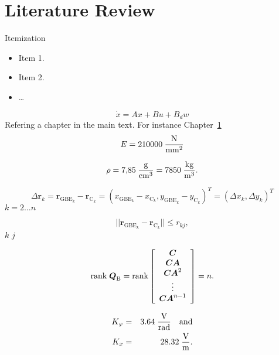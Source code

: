 \section{Literature Review}
\label{sec:review}
%
Itemization
\begin{itemize}
\item Item 1.
\item Item 2.
\item \ldots

\end{itemize}

\begin{equation}
\dot{x}=Ax+Bu+B_dw
\end{equation}
%
 Refering a chapter in the main text. For instance Chapter~\ref{sec:review} 
%
\begin{eqnarray} \nonumber
E = 210000\hspace{0.25em}{\mathrm{\frac{N}{mm^2}}}
\end{eqnarray}
%

%
\begin{eqnarray}\nonumber
\rho = 7{,}85\hspace{0.25em}{\mathrm{\frac{g}{cm^3}}}=
7850\hspace{0.25em}{\mathrm{\frac{kg}{m^3}}}.
\end{eqnarray}
%

\begin{equation}
  \Delta \boldsymbol{r}_k= \boldsymbol{r}_{\mathrm{GBE}_k} -
  \boldsymbol{r}_{\mathrm{C}_k} = (x_{\mathrm{GBE}_k} - x_{\mathrm{C}_k},
  y_{\mathrm{GBE}_k} - y_{\mathrm{C}_k})^T = (\Delta x_k,\Delta
  y_k)^T
\end{equation}
%
 $k=2 \dots n$

%
\begin{equation}
  || \boldsymbol{r}_{\mathrm{GBE}_k} -
  \boldsymbol{r}_{\mathrm{C}_k} || \leq  r_{kj},
\end{equation}
%
 $k$  $j$ 
%

\begin{equation}\label{26}
    {\rm rank} \; \boldsymbol{Q}_{\rm B} = {\rm rank} \left[
    \begin{array}{c}
    \mbox{$\boldsymbol{C}$} \\
    \mbox{$\boldsymbol{CA}$} \\
    \mbox{$\boldsymbol{CA}$}^2 \\
    \vdots \\
    \mbox{$\boldsymbol{CA}$}^{n-1}
    \end{array} \right] = n.
\end{equation}
%

%
\begin{eqnarray}
K_\varphi & = & 3.64\;\mathrm{\frac{V}{rad}}\quad\mbox{and}\\
K_x & = & 28.32 \;\mathrm{\frac{V}{m}}.
\end{eqnarray}
%
%
